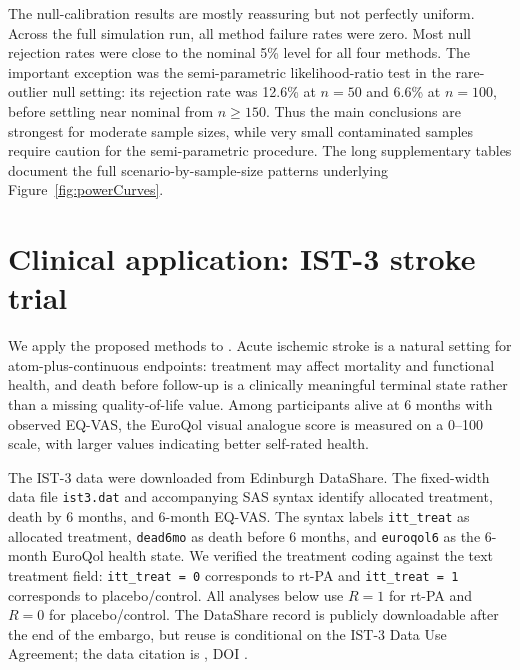 \documentclass[11pt]{article}
\begin{document}
The null-calibration results are mostly reassuring but not perfectly uniform. Across the full simulation run, all method failure rates were zero. Most null rejection rates were close to the nominal 5\% level for all four methods. The important exception was the semi-parametric likelihood-ratio test in the rare-outlier null setting: its rejection rate was 12.6\% at $n=50$ and 6.6\% at $n=100$, before settling near nominal from $n \ge 150$. Thus the main conclusions are strongest for moderate sample sizes, while very small contaminated samples require caution for the semi-parametric procedure. The long supplementary tables document the full scenario-by-sample-size patterns underlying Figure~\ref{fig:powerCurves}.

\section{Clinical application: IST-3 stroke trial}\label{sec:application}

We apply the proposed methods to \ApplicationDatasetDescription{} \citep{IST3Lancet2012,IST3DataShare}. Acute ischemic stroke is a natural setting for atom-plus-continuous endpoints: treatment may affect mortality and functional health, and death before follow-up is a clinically meaningful terminal state rather than a missing quality-of-life value. Among participants alive at 6 months with observed EQ-VAS, the EuroQol visual analogue score is measured on a 0--100 scale, with larger values indicating better self-rated health.

The IST-3 data were downloaded from Edinburgh DataShare. The fixed-width data file \texttt{ist3.dat} and accompanying SAS syntax identify allocated treatment, death by 6 months, and 6-month EQ-VAS. The syntax labels \texttt{itt\_treat} as allocated treatment, \texttt{dead6mo} as death before 6 months, and \texttt{euroqol6} as the 6-month EuroQol health state. We verified the treatment coding against the text treatment field: \texttt{itt\_treat = 0} corresponds to rt-PA and \texttt{itt\_treat = 1} corresponds to placebo/control. All analyses below use $R=1$ for rt-PA and $R=0$ for placebo/control. The DataShare record is publicly downloadable after the end of the embargo, but reuse is conditional on the IST-3 Data Use Agreement; the data citation is \citet{IST3DataShare}, DOI \ApplicationISTThreeDoi{}.
\end{document}

